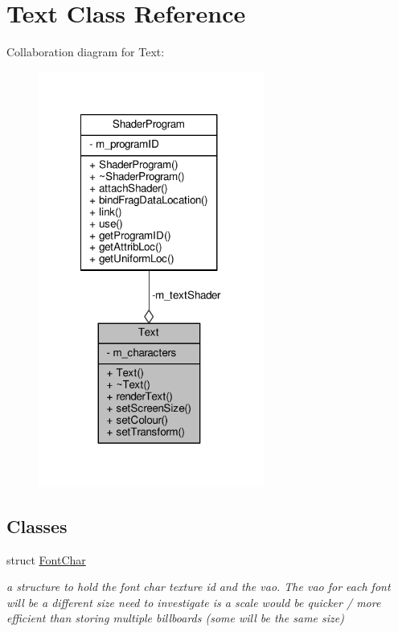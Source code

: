 \hypertarget{class_text}{\section{Text Class Reference}
\label{class_text}
}


Collaboration diagram for Text\-:
\nopagebreak
\begin{figure}[H]
\begin{center}
\leavevmode
\includegraphics[width=210pt]{class_text__coll__graph}
\end{center}
\end{figure}
\subsection*{Classes}
\begin{DoxyCompactItemize}
\item 
struct \hyperlink{struct_text_1_1_font_char}{Font\-Char}
\begin{DoxyCompactList}\small\item\em a structure to hold the font char texture id and the vao. The vao for each font will be a different size need to investigate is a scale would be quicker / more efficient than storing multiple billboards (some will be the same size) \end{DoxyCompactList}\end{DoxyCompactItemize}
